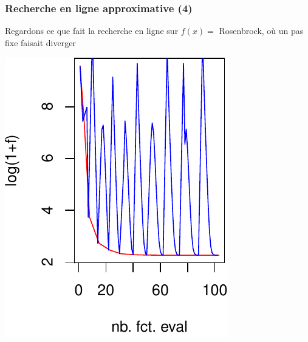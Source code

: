 \documentclass[12pt]{beamer}
\begin{document}
\begin{frame}
\frametitle{Recherche en ligne approximative (4)} 
Regardons ce que fait la recherche en ligne sur $f(x)=$ Rosenbrock, où un pas fixe faisait diverger
\begin{center}
\begin{minipage}[b]{0.3\textwidth}
\includegraphics[width=\textwidth]{gradient_rosen_LS_f-crop.pdf} 
\end{minipage}
\hspace{1.cm}
\begin{minipage}[b]{0.3\textwidth}

\end{minipage}
\end{center}
\end{frame}
\end{document}
